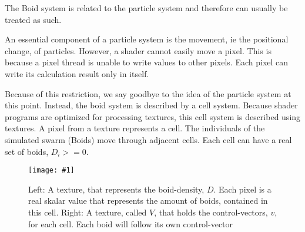 \documentclass[a4paper, 10pt, journal]{wissarbIEEE}      %
\newcommand{\bild}[3]{
\begin{figure}[h]
\centering
  \texttt{[image: \#1]}
  \caption{#3}
  \label{#1}
\end{figure}}
\begin{document}
The Boid system is related to the particle system \cite{Reynolds87flocks} and therefore can usually be treated as such. 
 

An essential component of a particle system is the movement, ie the positional change, of particles. However, a shader cannot easily move a pixel. This is because a pixel thread is unable to write values to other pixels. Each pixel can write its calculation result only in itself.



Because of this restriction, we say goodbye to the idea of the particle system at this point. Instead, the boid system is described by a cell system. Because shader programs are optimized for processing textures, this cell system is described using textures. A pixel from a texture represents a cell. The individuals of the simulated swarm (Boids) move through adjacent cells. Each cell can have a real set of boids, $D_i>=0$.



\bild{bilder/Schwarmdarstellung}{5cm}{Left: A texture, that represents the boid-density, $D$. Each pixel is a real skalar value that represents the amount of boids, contained in this cell. Right: A texture, called $V$, that holds the control-vectors, $v$, for each cell. Each boid will follow its own control-vector}

\end{document}
